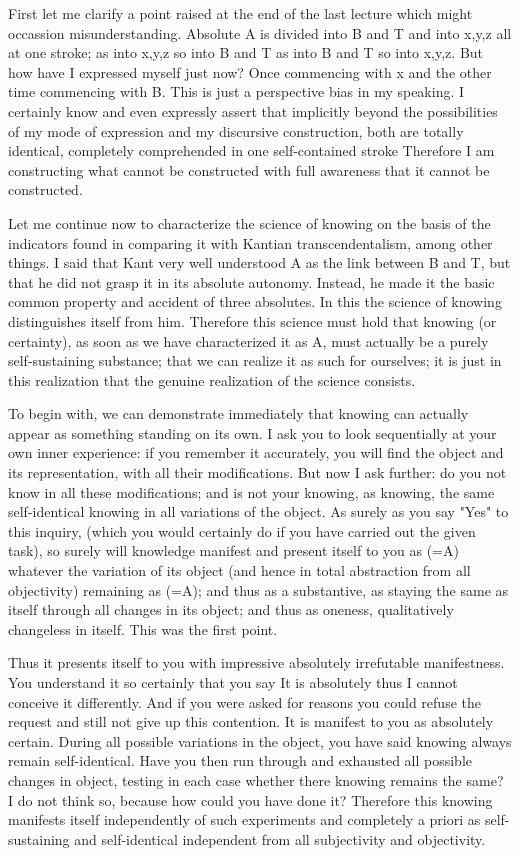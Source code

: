 \documentclass{article}
\begin{document}
First let me clarify a point raised at the end of the last lecture
which might occassion misunderstanding.
Absolute A is divided into B and T and into x,y,z all at one stroke;
as into x,y,z so into B and T as into B and T so into x,y,z. 
But how have I expressed myself just now?
Once commencing with x and the other time commencing with B.
This is just a perspective bias in my speaking.
I certainly know and even expressly assert that implicitly
beyond the possibilities of my mode of expression 
and my discursive construction, both are totally identical,
completely comprehended in one self-contained stroke
Therefore I am constructing what cannot be constructed
with full awareness that it cannot be constructed. 

Let me continue now to characterize the science of knowing 
on the basis of the indicators found in comparing it with 
Kantian transcendentalism, among other things.
I said that Kant very well understood 
A as the link between B and T,
but that he did not grasp it in its absolute autonomy.
Instead, he made it the basic common property and accident of three absolutes.
In this the science of knowing distinguishes itself from him.
Therefore this science must hold that knowing (or certainty),
as soon as we have characterized it as A, 
must actually be a purely self-sustaining substance;
that we can realize it as such for ourselves;
it is just in this realization that
the genuine realization of the science consists.

To begin with, we can demonstrate immediately that
knowing can actually appear as something standing on its own.
I ask you to look sequentially at your own inner experience: 
if you remember it accurately, you will find the object
and its representation, with all their modifications. 
But now I ask further:
do you not know in all these modifications;
and is not your knowing, as knowing,
the same self-identical knowing in all variations of the object.
As surely as you say "Yes" to this inquiry,
(which you would certainly do 
if you have carried out the given task),
so surely will knowledge manifest 
and present itself to you as (=A)
whatever the variation of its object 
(and hence in total abstraction from all objectivity)
remaining as (=A);
and thus as a substantive,
as staying the same as itself through all changes in its object;
and thus as oneness, qualitatively changeless in itself.
This was the first point.

Thus it presents itself to you with 
impressive absolutely irrefutable manifestness.
You understand it so certainly that you say
It is absolutely thus I cannot conceive it differently.
And if you were asked for reasons you could refuse the request
and still not give up this contention.
It is manifest to you as absolutely certain. 
During all possible variations in the object, 
you have said knowing always remain self-identical.
Have you then run through and exhausted all possible changes in object,
testing in each case whether there knowing remains the same?
I do not think so, because how could you have done it?
Therefore this knowing manifests itself independently of such experiments
and completely a priori as self-sustaining and self-identical
independent from all subjectivity and objectivity.
\end{document}
